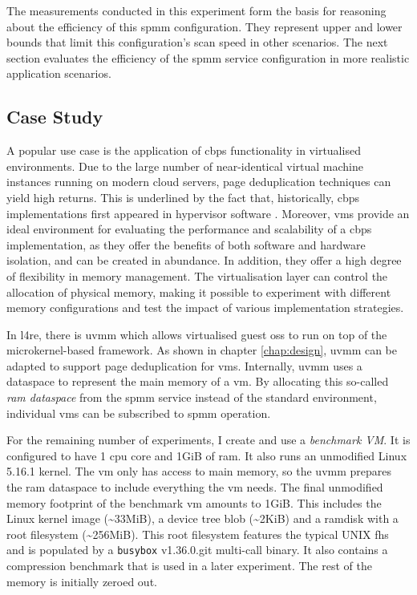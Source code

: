 The measurements conducted in this experiment form the basis for reasoning about the efficiency of this \ac{spmm} configuration.
They represent upper and lower bounds that limit this configuration's scan speed in other scenarios.
The next section evaluates the efficiency of the \ac{spmm} service configuration in more realistic application scenarios.

\subsection{Case Study}
\label{subsec:case-study}

A popular use case is the application of \ac{cbps} functionality in virtualised environments.
Due to the large number of near-identical virtual machine instances running on modern cloud servers, page deduplication techniques can yield high returns.
This is underlined by the fact that, historically, \ac{cbps} implementations first appeared in hypervisor software \cite{vmware-tps-patent}.
Moreover, \Acp{vm} provide an ideal environment for evaluating the performance and scalability of a \ac{cbps} implementation, as they offer the benefits of both software and hardware isolation, and can be created in abundance.
In addition, they offer a high degree of flexibility in memory management.
The virtualisation layer can control the allocation of physical memory, making it possible to experiment with different memory configurations and test the impact of various implementation strategies.

In \ac{l4re}, there is \ac{uvmm} which allows virtualised guest \acp{os} to run on top of the microkernel-based framework.
As shown in chapter \ref{chap:design}, \ac{uvmm} can be adapted to support page deduplication for \acp{vm}.
Internally, \ac{uvmm} uses a dataspace to represent the main memory of a \ac{vm}.
By allocating this so-called \emph{\acs{ram} dataspace} from the \ac{spmm} service instead of the standard environment, individual \acp{vm} can be subscribed to \ac{spmm} operation.

For the remaining number of experiments, I create and use a \emph{benchmark VM}.
It is configured to have 1 \ac{cpu} core and 1GiB of \ac{ram}.
It also runs an unmodified Linux 5.16.1 kernel.
The \ac{vm} only has access to main memory, so the \ac{uvmm} prepares the \ac{ram} dataspace to include everything the \ac{vm} needs.
The final unmodified memory footprint of the benchmark \ac{vm} amounts to 1GiB.
This includes the Linux kernel image (\textasciitilde{}33MiB), a device tree blob (\textasciitilde{}2KiB) and a ramdisk with a root filesystem (\textasciitilde{}256MiB).
This root filesystem features the typical UNIX \ac{fhs} and is populated by a \texttt{busybox} v1.36.0.git multi-call binary.
It also contains a compression benchmark that is used in a later experiment.
The rest of the memory is initially zeroed out.

